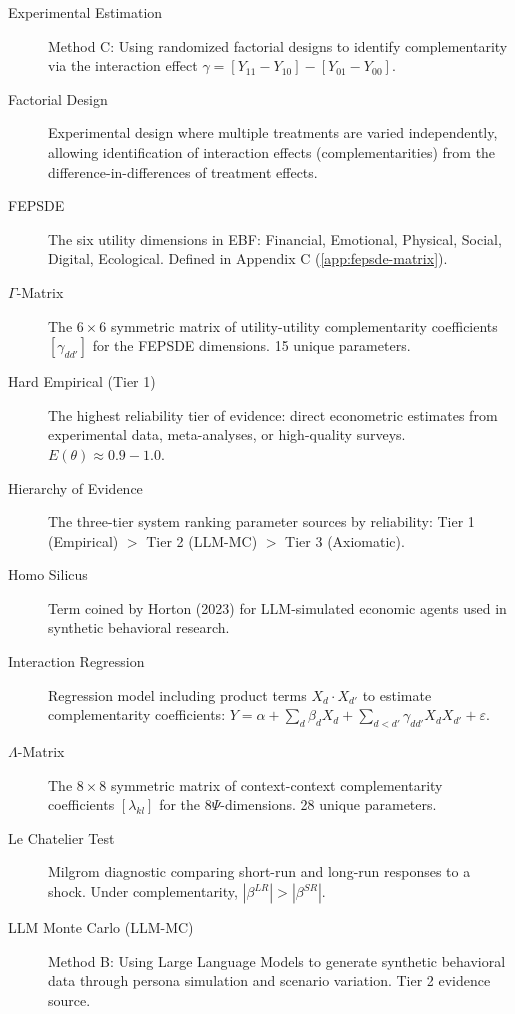 \documentclass[11pt,a4paper]{article}
\theoremstyle{definition}
\begin{document}
\begin{description}
\item[Experimental Estimation]
Method C: Using randomized factorial designs to identify complementarity via 
the interaction effect $\gamma = [Y_{11} - Y_{10}] - [Y_{01} - Y_{00}]$.

\item[Factorial Design]
Experimental design where multiple treatments are varied independently, 
allowing identification of interaction effects (complementarities) from 
the difference-in-differences of treatment effects.

\item[FEPSDE]
The six utility dimensions in EBF: Financial, Emotional, Physical, 
Social, Digital, Ecological. Defined in Appendix C (\ref{app:fepsde-matrix}).

\item[$\Gamma$-Matrix]
The $6 \times 6$ symmetric matrix of utility-utility complementarity 
coefficients $[\gamma_{dd'}]$ for the FEPSDE dimensions. 15 unique parameters.

\item[Hard Empirical (Tier 1)]
The highest reliability tier of evidence: direct econometric estimates from 
experimental data, meta-analyses, or high-quality surveys. $E(\theta) \approx 0.9-1.0$.

\item[Hierarchy of Evidence]
The three-tier system ranking parameter sources by reliability: 
Tier 1 (Empirical) $>$ Tier 2 (LLM-MC) $>$ Tier 3 (Axiomatic).

\item[Homo Silicus]
Term coined by Horton (2023) for LLM-simulated economic agents used in 
synthetic behavioral research.

\item[Interaction Regression]
Regression model including product terms $X_d \cdot X_{d'}$ to estimate 
complementarity coefficients: $Y = \alpha + \sum_d \beta_d X_d + \sum_{d<d'} \gamma_{dd'} X_d X_{d'} + \varepsilon$.

\item[$\Lambda$-Matrix]
The $8 \times 8$ symmetric matrix of context-context complementarity 
coefficients $[\lambda_{kl}]$ for the 8$\Psi$-dimensions. 28 unique parameters.

\item[Le Chatelier Test]
Milgrom diagnostic comparing short-run and long-run responses to a shock. 
Under complementarity, $|\beta^{LR}| > |\beta^{SR}|$.

\item[LLM Monte Carlo (LLM-MC)]
Method B: Using Large Language Models to generate synthetic behavioral data 
through persona simulation and scenario variation. Tier 2 evidence source.


\end{description}
\end{document}
